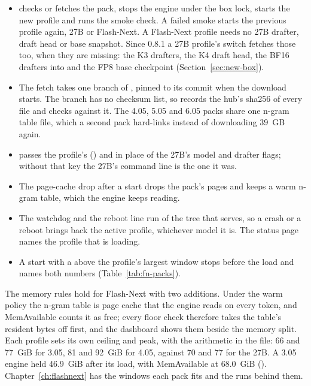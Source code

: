 \begin{itemize}
\item {} checks or fetches the pack, stops the engine under the box lock, starts the new profile and runs the smoke check. A failed smoke starts the previous profile again, 27B or Flash-Next. A Flash-Next profile needs no 27B drafter, draft head or base snapshot. Since 0.8.1 a 27B profile's switch fetches those too, when they are missing: the K3 drafters, the K4 draft head, the BF16 drafters into  and the FP8 base checkpoint (Section~\ref{sec:new-box}).
\item The fetch takes one branch of , pinned to its commit when the download starts. The branch has no checksum list, so  records the hub's sha256 of every file and checks against it. The 4.05, 5.05 and 6.05 packs share one n-gram table file, which a second pack hard-links instead of downloading 39~GB again.
\item {} passes the profile's  () and  in place of the 27B's model and drafter flags; without that key the 27B's command line is the one it was.
\item The page-cache drop after a start drops the pack's pages and keeps a warm n-gram table, which the engine keeps reading.
\item The watchdog and the reboot line run  of the tree that serves, so a crash or a reboot brings back the active profile, whichever model it is. The status page names the profile that is loading.
\item A start with a  above the profile's largest window stops before the load and names both numbers (Table~\ref{tab:fn-packs}).
\end{itemize}

The memory rules hold for Flash-Next with two additions. Under the warm policy the n-gram table is page cache that the engine reads on every token, and MemAvailable counts it as free; every floor check therefore takes the table's resident bytes off first, and the dashboard shows them beside the memory split. Each profile sets its own ceiling and peak, with the arithmetic in the file: 66 and 77~GiB for 3.05, 81 and 92~GiB for 4.05, against 70 and 77 for the 27B. A 3.05 engine held 46.9~GiB after its load, with MemAvailable at 68.0~GiB (\measured). Chapter~\ref{ch:flashnext} has the windows each pack fits and the runs behind them.

